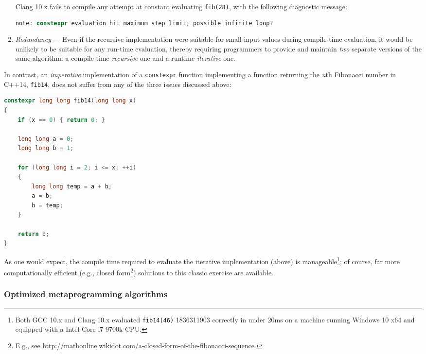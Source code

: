 \begin{enumerate}
{{{\noindent Clang 10.x fails to compile any attempt at constant evaluating \texttt{fib(28)}, with the following diagnostic message:

\begin{lstlisting}[language=C++, basicstyle={\ttfamily\footnotesize}]
note: constexpr evaluation hit maximum step limit; possible infinite loop?
\end{lstlisting}
}} %
} %
\item{\emph{Redundancy} — Even if the recursive implementation were suitable for small input values during compile-time evaluation, it would be unlikely to be suitable for any run-time evaluation, thereby requiring programmers to provide and maintain \emph{two} separate versions of the same algorithm: a compile-time \emph{recursive} one and a runtime \emph{iterative} one.}
\end{enumerate}

In contrast, an \emph{imperative} implementation of a \texttt{constexpr}
function implementing a function returning the \emph{n\/}th Fibonacci
number in C++14, \texttt{fib14}, does not suffer from any of the three
issues discussed above:

\begin{lstlisting}[language=C++]
constexpr long long fib14(long long x)
{
    if (x == 0) { return 0; }

    long long a = 0;
    long long b = 1;

    for (long long i = 2; i <= x; ++i)
    {
        long long temp = a + b;
        a = b;
        b = temp;
    }

    return b;
}
\end{lstlisting}

\noindent As one would expect, the compile time required to evaluate the iterative
implementation (above) is manageable{\cprotect\footnote{Both GCC 10.x
and Clang 10.x evaluated \texttt{fib14(46)} 1836311903 correctly in
under 20ms on a machine running Windows 10 x64 and equipped with a
  Intel Core i7-9700k CPU.}}; of course, far more
computationally efficient (e.g., closed form{\cprotect\footnote{E.g.,
see
  http://mathonline.wikidot.com/a-closed-form-of-the-fibonacci-sequence.}})
solutions to this classic exercise are available.

\subsubsection[Optimized metaprogramming algorithms]{Optimized metaprogramming algorithms}\label{optimized-metaprogramming-algorithms}

